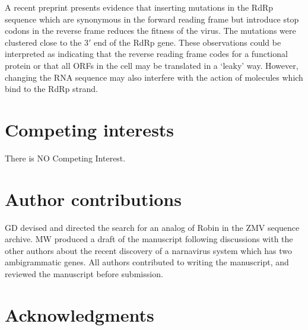 \documentclass[unnumsec,webpdf,contemporary,large,namedate]{oup-authoring-template}%
\theoremstyle{thmstyleone}%
\theoremstyle{thmstyletwo}%
\theoremstyle{thmstylethree}%
\begin{document}

A recent preprint \citep{Ret+20}
presents evidence that inserting mutations in the RdRp sequence which are synonymous in the forward
reading frame but introduce stop codons in the reverse frame reduces the fitness of the virus. The mutations
were clustered close to the $3'$ end of the RdRp gene. These
observations could be interpreted as indicating that the reverse reading frame codes for a functional
protein or that all ORFs in the cell may be translated in a \lq leaky' way.
However, changing the RNA sequence may also interfere with the action of molecules which
bind to the RdRp strand.

\section{Competing interests}
There is NO Competing Interest.

\section{Author contributions}

GD devised and directed the search for an analog of Robin in the ZMV sequence
archive. MW produced a draft of the manuscript following discussions with the other
authors about the recent discovery of a narnavirus system which has two
ambigrammatic genes. All authors contributed to writing the manuscript, and
reviewed the manuscript before submission.


\section{Acknowledgments}
\end{document}
